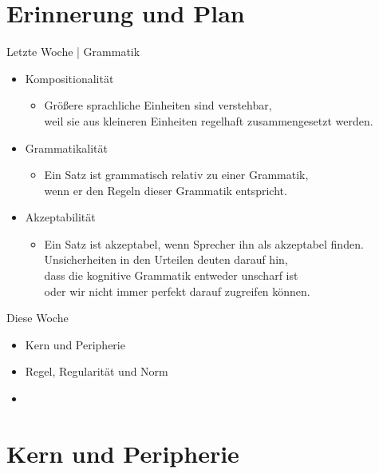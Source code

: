 \section{Erinnerung und Plan}

\begin{frame}
  {Letzte Woche | Grammatik}
  \onslide<+->
  \begin{itemize}[<+->]
    \item Kompositionalität
      \begin{itemize}[<+->]
        \item Größere sprachliche Einheiten sind verstehbar,\\
          weil sie aus kleineren Einheiten regelhaft zusammengesetzt werden. 
      \end{itemize}
      \Zeile
    \item Grammatikalität
      \begin{itemize}[<+->]
        \item Ein Satz ist grammatisch relativ zu einer Grammatik,\\
          wenn er den Regeln dieser Grammatik entspricht.
      \end{itemize}
      \Zeile
    \item Akzeptabilität
      \begin{itemize}[<+->]
        \item Ein Satz ist akzeptabel, wenn Sprecher ihn als akzeptabel finden.\\
          Unsicherheiten in den Urteilen deuten darauf hin,\\
          dass die kognitive Grammatik entweder unscharf ist\\
          oder wir nicht immer perfekt darauf zugreifen können.
      \end{itemize}
  \end{itemize}
\end{frame}


\begin{frame}
  {Diese Woche}
  \onslide<+->
  \begin{itemize}[<+->]
    \item Kern und Peripherie
    \Zeile
    \item Regel, Regularität und Norm
      \Zeile
    \item \citet[Kap.~1]{Schaefer2018b}
  \end{itemize}
\end{frame}


\section{Kern und Peripherie}

